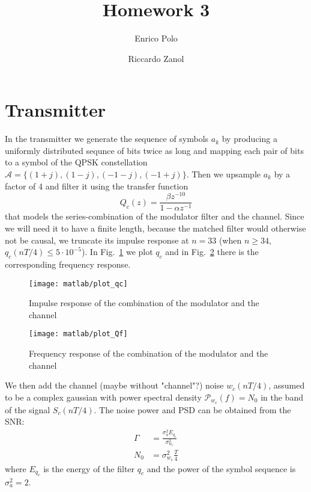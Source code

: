\documentclass[a4paper,oneside]{article}
\author{Enrico Polo \and Riccardo Zanol}
\title{Homework 3}
\begin{document}
\maketitle
\section{Transmitter}
In the transmitter we generate the sequence of symbols $a_k$ by
producing a uniformly distributed sequnce of bits twice as long and
mapping each pair of bits to a symbol of the QPSK constellation $
\mathcal{A} = \{(1+j),(1-j),(-1-j),(-1+j)\}$. Then we upsample $a_k$
by a factor of 4 and filter it using the transfer function
\begin{equation}
  Q_c(z) = \frac{\beta z^{-10}}{1 - \alpha z^{-1}}
\end{equation}
that models the {\color{red} series-combination of the modulator filter and
  the channel}.  Since we will need it to have a finite length,
because the matched filter would otherwise not be causal, we truncate
its impulse response at $n=33$ (when $n \geq 34$, $q_c(nT/4) \leq
5\cdot10^{-5}$). In Fig.~\ref{plot:qc} we plot $q_c$ and in
Fig.~\ref{plot:Qf} there is the corresponding frequency response.
\begin{figure}[htbp]
  \centering
  \texttt{[image: matlab/plot\_qc]}
  \caption{Impulse response of the combination of the modulator and
    the channel}
  \label{plot:qc}
\end{figure}
\begin{figure}[htbp]
  \centering
  \texttt{[image: matlab/plot\_Qf]}
  \caption{Frequency response of the combination of the modulator and
    the channel}
  \label{plot:Qf}
\end{figure}

We then add {\color{red} the channel (maybe without "channel"?) noise} $w_c(nT/4)$, assumed to be
a complex gaussian with power spectral density $\mathcal{P}_{w_c}(f) =
N_0$ in the band of the signal $S_c(nT/4)$. The noise power and PSD
can be obtained from the SNR:
\begin{align}
  \Gamma &= \frac{\sigma^2_a E_{q_c}}{\sigma^2_{w_c}} \\
  N_0 &= \sigma^2_{w_c}\frac{T}{4}
\end{align}
where $E_{q_c}$ is the energy of the filter $q_c$ and the power of the
symbol sequence is $\sigma^2_a = 2$.
\end{document}
